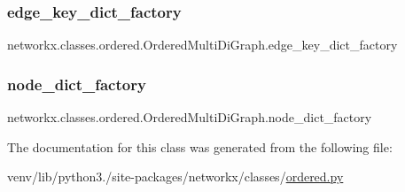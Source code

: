 \subsubsection{\texorpdfstring{edge\+\_\+key\+\_\+dict\+\_\+factory}{edge\_key\_dict\_factory}}
{\footnotesize\ttfamily networkx.\+classes.\+ordered.\+Ordered\+Multi\+Di\+Graph.\+edge\+\_\+key\+\_\+dict\+\_\+factory\hspace{0.3cm}{\ttfamily [static]}}

\mbox{\label{classnetworkx_1_1classes_1_1ordered_1_1OrderedMultiDiGraph_a7922499c9b302951d44ca4895048bac9}} 
\subsubsection{\texorpdfstring{node\+\_\+dict\+\_\+factory}{node\_dict\_factory}}
{\footnotesize\ttfamily networkx.\+classes.\+ordered.\+Ordered\+Multi\+Di\+Graph.\+node\+\_\+dict\+\_\+factory\hspace{0.3cm}{\ttfamily [static]}}



The documentation for this class was generated from the following file\+:\begin{DoxyCompactItemize}
\item 
venv/lib/python3./site-\/packages/networkx/classes/\hyperlink{ordered_8py}{ordered.\+py}\end{DoxyCompactItemize}
